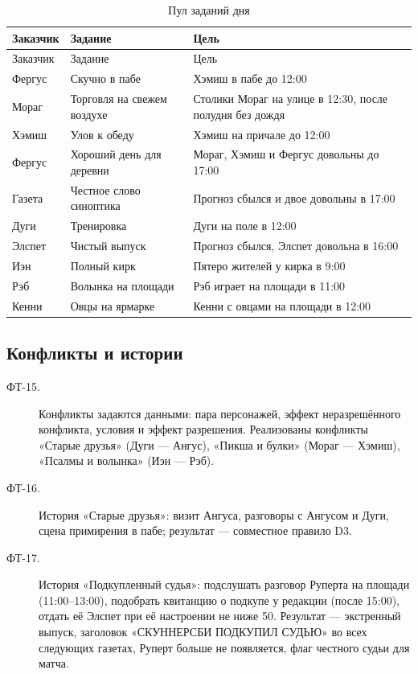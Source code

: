 \documentclass[12pt]{article}
\begin{document}
{\small\singlespacing
\begin{longtable}{|p{24mm}|p{50mm}|p{80mm}|}
\caption{Пул заданий дня}\label{tab:tasks}\\\hline
Заказчик & Задание & Цель\\\hline\endfirsthead
\hline Заказчик & Задание & Цель\\\hline\endhead
Фергус & Скучно в пабе & Хэмиш в пабе до 12:00\\\hline
Мораг & Торговля на свежем воздухе & Столики Мораг на улице в 12:30, после полудня без дождя\\\hline
Хэмиш & Улов к обеду & Хэмиш на причале до 12:00\\\hline
Фергус & Хороший день для деревни & Мораг, Хэмиш и Фергус довольны до 17:00\\\hline
Газета & Честное слово синоптика & Прогноз сбылся и двое довольны в 17:00\\\hline
Дуги & Тренировка & Дуги на поле в 12:00\\\hline
Элспет & Чистый выпуск & Прогноз сбылся, Элспет довольна в 16:00\\\hline
Иэн & Полный кирк & Пятеро жителей у кирка в 9:00\\\hline
Рэб & Волынка на площади & Рэб играет на площади в 11:00\\\hline
Кенни & Овцы на ярмарке & Кенни с овцами на площади в 12:00\\\hline
\end{longtable}}

\subsection{Конфликты и истории}
\begin{description}
\item[ФТ-15.] Конфликты задаются данными: пара персонажей, эффект неразрешённого конфликта, условия и эффект разрешения. Реализованы конфликты «Старые друзья» (Дуги — Ангус), «Пикша и булки» (Мораг — Хэмиш), «Псалмы и волынка» (Иэн — Рэб).
\item[ФТ-16.] История «Старые друзья»: визит Ангуса, разговоры с Ангусом и Дуги, сцена примирения в пабе; результат — совместное правило D3.
\item[ФТ-17.] История «Подкупленный судья»: подслушать разговор Руперта на площади (11:00–13:00), подобрать квитанцию о подкупе у редакции (после 15:00), отдать её Элспет при её настроении не ниже 50. Результат — экстренный выпуск, заголовок «СКУННЕРСБИ ПОДКУПИЛ СУДЬЮ» во всех следующих газетах, Руперт больше не появляется, флаг честного судьи для матча.
\end{description}
\end{document}
